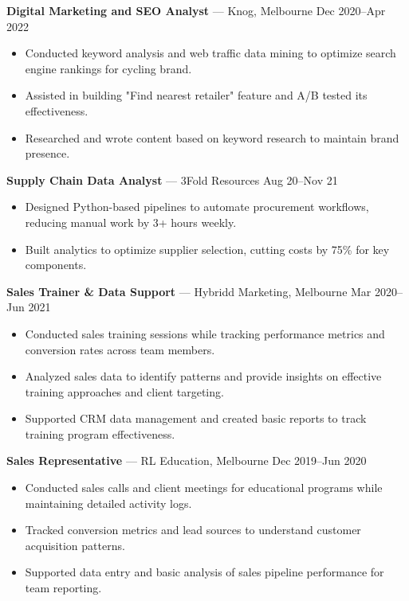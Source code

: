 \documentclass[10pt,letterpaper]{article}
\begin{document}
\begin{samepage}
\textbf{Digital Marketing and SEO Analyst} — Knog, Melbourne \hfill Dec 2020--Apr 2022\\[-1.1em]
\begin{itemize}
  \item Conducted keyword analysis and web traffic data mining to optimize search engine rankings for cycling brand.
  \item Assisted in building "Find nearest retailer" feature and A/B tested its effectiveness.
  \item Researched and wrote content based on keyword research to maintain brand presence.
\end{itemize}
\end{samepage}

\begin{samepage}
\textbf{Supply Chain Data Analyst} — 3Fold Resources \hfill Aug 20--Nov 21\\[-1.1em]
\begin{itemize}
  \item Designed Python-based pipelines to automate procurement workflows, reducing manual work by 3+ hours weekly.
  \item Built analytics to optimize supplier selection, cutting costs by 75\% for key components.
\end{itemize}
\end{samepage}

\textbf{Sales Trainer \& Data Support} — Hybridd Marketing, Melbourne \hfill Mar 2020--Jun 2021\\[-1.1em]
\begin{itemize}
  \item Conducted sales training sessions while tracking performance metrics and conversion rates across team members.
  \item Analyzed sales data to identify patterns and provide insights on effective training approaches and client targeting.
  \item Supported CRM data management and created basic reports to track training program effectiveness.
\end{itemize}

\textbf{Sales Representative} — RL Education, Melbourne \hfill Dec 2019--Jun 2020\\[-1.1em]
\begin{itemize}
  \item Conducted sales calls and client meetings for educational programs while maintaining detailed activity logs.
  \item Tracked conversion metrics and lead sources to understand customer acquisition patterns.
  \item Supported data entry and basic analysis of sales pipeline performance for team reporting.
\end{itemize}
\end{document}
